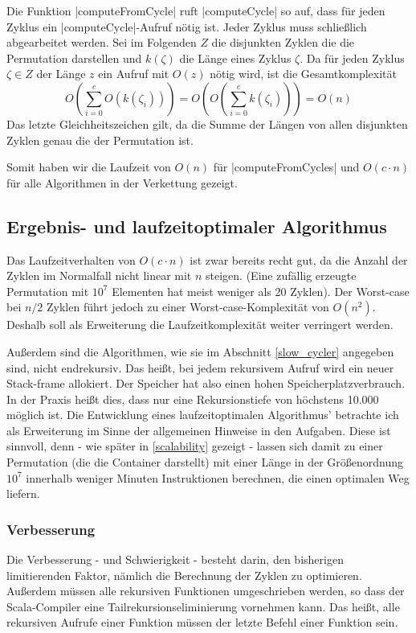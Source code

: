 Die Funktion |computeFromCycle| ruft |computeCycle| so auf, dass für jeden Zyklus ein |computeCycle|-Aufruf nötig ist. Jeder Zyklus muss schließlich abgearbeitet werden.
Sei im Folgenden $Z$ die disjunkten Zyklen die die Permutation darstellen und $k(\zeta)$ die Länge eines Zyklus $\zeta$.
Da für jeden Zyklus $\zeta \in Z$ der Länge $z$ ein Aufruf mit $O(z)$ nötig wird, ist die Gesamtkomplexität
\[O(\sum_{i=0}^{c}{O(k(\zeta_i))})=O(O(\sum_{i=0}^{c}{k(\zeta_i)}))=O(n)\]
Das letzte Gleichheitszeichen gilt, da die Summe der Längen von allen disjunkten Zyklen genau die der Permutation ist.

Somit haben wir die Laufzeit von $O(n)$ für |computeFromCycles| und $O(c \cdot n)$ für alle Algorithmen in der Verkettung gezeigt.
\clearpage
\subsection{Ergebnis- und laufzeitoptimaler Algorithmus}
\label{fast_cycler}
Das Laufzeitverhalten von $O(c \cdot n)$ ist zwar bereits recht gut, da die Anzahl der Zyklen im Normalfall nicht linear mit $n$ steigen.
(Eine zufällig erzeugte Permutation mit $10^7$ Elementen hat meist weniger als 20 Zyklen).
Der Worst-case bei $n/2$ Zyklen führt jedoch zu einer Worst-case-Komplexität von $O(n^2)$.
Deshalb soll als Erweiterung die Laufzeitkomplexität weiter verringert werden.

Außerdem sind die Algorithmen, wie sie im Abschnitt \ref{slow_cycler} angegeben sind, nicht endrekursiv.
Das heißt, bei jedem rekursivem Aufruf wird ein neuer Stack-frame allokiert.
Der Speicher hat also einen hohen Speicherplatzverbrauch.
In der Praxis heißt dies, dass nur eine Rekursionstiefe von höchstens 10.000 möglich ist.
Die Entwicklung eines laufzeitoptimalen Algorithmus' betrachte ich als Erweiterung im Sinne der allgemeinen Hinweise in den Aufgaben.
Diese ist sinnvoll, denn - wie später in \ref{scalability} gezeigt -
lassen sich damit zu einer Permutation (die die Container darstellt)
mit einer Länge in der Größenordnung $10^7$ innerhalb weniger Minuten Instruktionen berechnen, die einen optimalen Weg liefern.
\subsubsection{Verbesserung}
Die Verbesserung - und Schwierigkeit - besteht darin, den bisherigen limitierenden Faktor, nämlich die Berechnung der Zyklen zu optimieren.
Außerdem müssen alle rekursiven Funktionen umgeschrieben werden, so dass der Scala-Compiler eine Tailrekursionseliminierung vornehmen kann.
Das heißt, alle rekursiven Aufrufe einer Funktion müssen der letzte Befehl einer Funktion sein.

